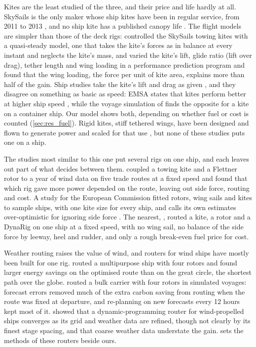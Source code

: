 Kites are the least studied of the three, and their price and life hardly at all. SkySails is the only maker whose ship kites have been in regular service, from 2011 to 2013 \citep{skysails2018}, and no ship kite has a published canopy life \citep{emsa2023}. The flight models are simpler than those of the deck rigs: \citet{erhard2013} controlled the SkySails towing kites with a quasi-steady model, one that takes the kite's forces as in balance at every instant and neglects the kite's mass, and \citet{penloup2021} varied the kite's lift, glide ratio (lift over drag), tether length and wing loading in a performance prediction program and found that the wing loading, the force per unit of kite area, explains more than half of the gain. Ship studies take the kite's lift and drag as given \citep{traut2014,podeur2016}, and they disagree on something as basic as speed: EMSA states that kites perform better at higher ship speed \citep{emsa2023}, while the voyage simulation of \citet{podeur2016} finds the opposite for a kite on a container ship. Our model shows both, depending on whether fuel or cost is counted (\cref{sec:res_fuel}). Rigid kites, stiff tethered wings, have been designed and flown to generate power \citep{echeverri2020part1,bauer2018} and scaled for that use \citep{eijkelhof2020reference,sommerfeld2022scaling,vanhagen2023,joshi2025}, but none of these studies puts one on a ship.

The studies most similar to this one put several rigs on one ship, and each leaves out part of what decides between them. \citet{traut2014} coupled a towing kite and a Flettner rotor to a year of wind data on five trade routes at a fixed speed and found that which rig gave more power depended on the route, leaving out side force, routing and cost. A study for the European Commission fitted rotors, wing sails and kites to sample ships, with one kite size for every ship, and calls its own estimates over-optimistic for ignoring side force \citep{cedelft2016}. The nearest, \citet{bentin2018}, routed a kite, a rotor and a DynaRig on one ship at a fixed speed, with no wing sail, no balance of the side force by leeway, heel and rudder, and only a rough break-even fuel price for cost.

Weather routing raises the value of wind, and routers for wind ships have mostly been built for one rig. \citet{bentin2016} routed a multipurpose ship with four rotors and found larger energy savings on the optimised route than on the great circle, the shortest path over the globe. \citet{mason2023} routed a bulk carrier with four rotors in simulated voyages: forecast errors removed much of the extra carbon saving from routing when the route was fixed at departure, and re-planning on new forecasts every 12 hours kept most of it. \citet{wendling2025} showed that a dynamic-programming router for wind-propelled ships converges as its grid and weather data are refined, though not clearly by its finest stage spacing, and that coarse weather data understate the gain.  sets the methods of these routers beside ours.

